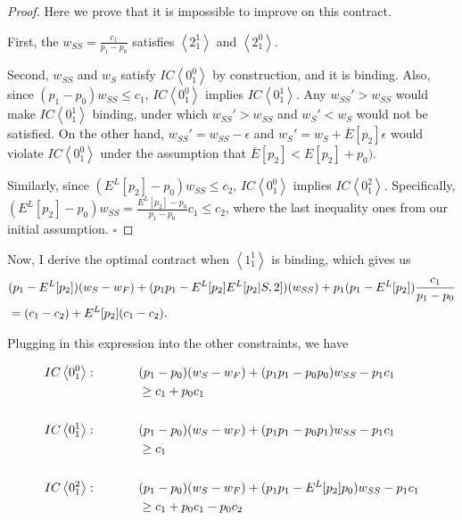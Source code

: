 \documentclass[11pt]{article} %
\theoremstyle{exampstyle}
\newcommand{\eq}[1]{\begin{align}#1\end{align}}
\newcommand{\la}{ \left < }
\newcommand{\ra}{ \right > }
\begin{document}
\begin{proof}

Here we prove that it is impossible to improve on this contract. 

First, the $w_{SS} = \frac{c_1}{p_1 - p_0}$ satisfies $\la 2^1_1\ra$ and $\la 2^0_1\ra$.

Second, $w_{SS}$ and $w_{S}$ satisfy $IC \la 0^0_1 \ra $ by construction, and it is binding. Also, since $(p_1-p_0) w_{SS}  \le c_1$, $IC \la 0^0_1\ra$ implies $IC \la 0^1_1\ra$. Any $w_{SS}'>w_{SS}$ would make $IC \la 0^1_1 \ra$ binding, under which $w_{SS}'>w_{SS}$ and $w_{S}'<w_S$ would not be satisfied. On the other hand, $w_{SS}'=w_{SS} - \epsilon$ and $w_S'=w_S+\overline{E}[p_2] \epsilon$  would violate $IC \la 0^0_1 \ra$ under the assumption that $\overline{E}[p_2] < E[p_2] + p_0)$. 

Similarly, since $(E^L[p_2] - p_0) w_{SS} \le c_2$, $IC \la 0^0_1\ra$ implies $IC \la 0^2_1\ra$. Specifically, $(E^L[p_2] - p_0) w_{SS} = \frac{ E^L[p_2] - p_0}{p_1-p_0} c_1\le c_2$, where the last inequality ones from our initial assumption.            \hspace{.5in} $\square$

\end{proof}

Now, I derive the optimal contract when $\la 1^1_1 \ra$ is binding, which gives us
\eq{
 &(p_1-E^L[p_2])(w_S-w_F) + (p_1 p_1-E^L[p_2] E^L[p_2 | S,2]  )( w_{SS} ) + p_1 (p_1-E^L[p_2]) \frac{c_1}{p_1-p_0}   \notag \\
& = (c_1 - c_2) + E^L[p_2] (c_1 - c_2) \notag .
}

Plugging in this expression into the other constraints, we have

\eq{
IC\la0^0_1\ra: \hspace{.5in} & (p_1-p_0)(w_S-w_F) + (p_1p_1- p_0 p_0 )w_{SS}  - p_1 c_1 \notag \\
& \ge c_1 + p_0 c_1\notag \\
\notag 
\\
IC\la0^1_1\ra: \hspace{.5in}  & (p_1-p_0)(w_S-w_F) + (p_1p_1- p_0 p_1 ) w_{SS} - p_1 c_1 \notag \\
& \ge c_1  \notag \\
\notag 
\\
IC\la0^2_1\ra: \hspace{.5in}  & (p_1-p_0)(w_S-w_F) + (p_1p_1-E^L[p_2] p_0)w_{SS} - p_1 c_1 \notag \\
& \ge c_1 + p_0 c_1 - p_0 c_2 \notag 
} 
\end{document}

